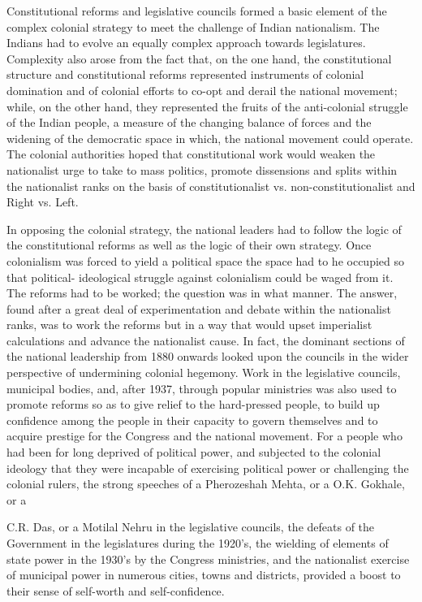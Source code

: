 \begin{multicols}{2}
Constitutional reforms and legislative councils formed a basic element of the complex colonial strategy to meet the challenge of Indian nationalism. The Indians had to evolve an equally complex approach towards legislatures. Complexity also arose from the fact that, on the one hand, the constitutional structure and constitutional reforms represented instruments of colonial domination and of colonial efforts to co-opt and derail the national movement; while, on the other hand, they represented the fruits of the anti-colonial struggle of the Indian people, a measure of the changing balance of forces and the widening of the democratic space in which, the national movement could operate. The colonial authorities hoped that constitutional work would weaken the nationalist urge to take to mass politics, promote dissensions and splits within the nationalist ranks on the basis of constitutionalist vs. non-constitutionalist and Right vs. Left.

In opposing the colonial strategy, the national leaders had to follow the logic of the constitutional reforms as well as the logic of their own strategy. Once colonialism was forced to yield a political space the space had to he occupied so that political- ideological struggle against colonialism could be waged from it. The reforms had to be worked; the question was in what manner. The answer, found after a great deal of experimentation and debate within the nationalist ranks, was to work the reforms but in a way that would upset imperialist calculations and advance the nationalist cause. In fact, the dominant sections of the national leadership from 1880 onwards looked upon the councils in the wider perspective of undermining colonial hegemony. Work in the legislative councils, municipal bodies, and, after 1937, through popular ministries was also used to promote reforms so as to give relief to the hard-pressed people, to build up confidence among the people in their capacity to govern themselves and to acquire prestige for the Congress and the national movement. For a people who had been for long deprived of political power, and subjected to the colonial ideology that they were incapable of exercising political power or challenging the colonial rulers, the strong speeches of a Pherozeshah Mehta, or a O.K. Gokhale, or a

C.R. Das, or a Motilal Nehru in the legislative councils, the defeats of the Government in the legislatures during the 1920's, the wielding of elements of state power in the 1930's by the Congress ministries, and the nationalist exercise of municipal power in numerous cities, towns and districts, provided a boost to their sense of self-worth and self-confidence.


\end{multicols}

